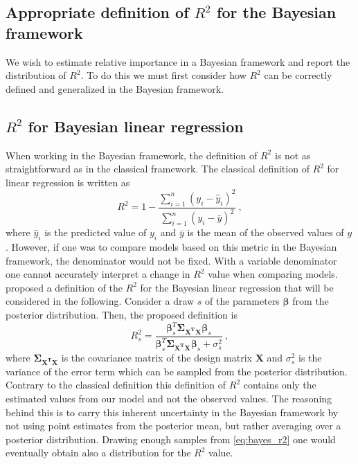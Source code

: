 \subsection{Appropriate definition of $R^2$ for the Bayesian framework}
We wish to estimate relative importance in a Bayesian framework and report the distribution of $R^2$. To do this we must first consider how $R^2$ can be correctly defined and generalized in the Bayesian framework. 
\subsection{$R^2$ for Bayesian linear regression}
\label{sec:bayes_R2}
When working in the Bayesian framework, the definition of $R^2$ is not as straightforward as in the classical framework. The classical definition of $R^2$ for linear regression is written as
\begin{equation}
    R^2 = 1 - \frac{\sum_{i=1}^{n}(y_i - \hat{y}_i)^2}{\sum_{i=1}^{n}(y_i - \bar{y})^2} \ ,
\end{equation}
where $\hat{y}_i$ is the predicted value of $y_i$ and $\bar{y}$ is the mean of the observed values of $y$. However, if one was to compare models based on this metric in the Bayesian framework, the denominator would not be fixed. With a variable denominator one cannot accurately interpret a change in $R^2$ value when comparing models. 
\citet{gelman2017rsquared} proposed a definition of the $R^2$ for the Bayesian linear regression that will be considered in the following. Consider a draw $s$ of the parameters $\boldsymbol{\beta}$ from the posterior distribution. Then, the proposed definition is
\begin{equation}
    \label{eq:bayes_r2}
    R_s^2 = \frac{\boldsymbol{\beta}_s^T \boldsymbol{\Sigma_{\mathbf{X^TX}}}\boldsymbol{\beta}_s}{\boldsymbol{\beta}_s^T \boldsymbol{\Sigma_{\mathbf{X^TX}}}\boldsymbol{\beta}_s + \sigma^2_s} \ ,
\end{equation}
where $\boldsymbol{\Sigma_{\mathbf{X^TX}}}$ is the covariance matrix of the design matrix $\mathbf{X}$ and $\sigma^2_s$ is the variance of the error term which can be sampled from the posterior distribution.
Contrary to the classical definition this definition of $R^2$ contains only the estimated values from our model and not the observed values. The reasoning behind this is to carry this inherent uncertainty in the Bayesian framework by not using point estimates from the posterior mean, but rather averaging over a posterior distribution. %
Drawing enough samples from \eqref{eq:bayes_r2} one would eventually obtain also a distribution for the $R^2$ value.

